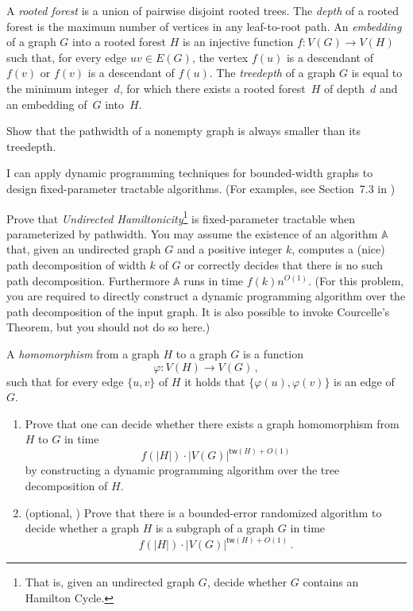 \documentclass[english]{uebung_cs}
\begin{document}
\begin{exercise}[Treedepth][\hard]
  A \emph{rooted forest} is a union of pairwise disjoint rooted trees. The \emph{depth} of a rooted forest is the maximum number of vertices in any leaf-to-root path. An \emph{embedding} of a graph $G$ into a rooted forest $H$ is an injective function $f \colon V (G) \rightarrow V(H)$ such that, for every edge $uv \in E(G)$, the vertex $f(u)$ is a descendant of $f(v)$ or $f(v)$ is a descendant of $f(u)$. The \emph{treedepth} of a graph $G$ is equal to the minimum integer~$d$, for which there exists a rooted forest~$H$ of depth~$d$ and an embedding of~$G$ into~$H$.

  Show that the pathwidth of a nonempty graph is always smaller than its treedepth.
\end{exercise}

\newpage
\begin{skill}
  I can apply dynamic programming techniques for bounded-width graphs to design fixed-parameter tractable algorithms. \normalfont (For examples, see Section~7.3 in \cygan{})
\end{skill}

\begin{exercise}
  Prove that \emph{Undirected Hamiltonicity}\footnote{That is, given an undirected graph $G$, decide whether $G$ contains an Hamilton Cycle.} is fixed-parameter tractable when parameterized by pathwidth. You may assume the existence of an algorithm $\mathbb{A}$ that, given an undirected graph $G$ and a positive integer $k$, computes a (nice) path decomposition of width $k$ of $G$ or correctly decides that there is no such path decomposition. Furthermore $\mathbb{A}$ runs in time $f(k) n^{O(1)}$. (For this problem, you are required to directly construct a dynamic programming algorithm over the path decomposition of the input graph. It is also possible to invoke Courcelle's Theorem, but you should not do so here.)
\end{exercise}

\begin{exercise}
  A \emph{homomorphism} from a graph $H$ to a graph $G$ is a function \[\varphi:V(H)\rightarrow V(G) \,, \] such that for every edge $\{u,v\}$ of $H$ it holds that $\{\varphi(u),\varphi(v)\}$ is an edge of $G$.
  \begin{enumerate}
    \item Prove that one can decide whether there exists a graph homomorphism from $H$ to $G$ in time
          \[f(|H|)\cdot |V(G)|^{\mathsf{tw}(H)+O(1)} \]
          by constructing a dynamic programming algorithm over the tree decomposition of $H$.
    \item (optional, \hard) Prove that there is a bounded-error randomized algorithm to decide whether a graph $H$ is a subgraph of a graph $G$ in time
          \[f(|H|)\cdot |V(G)|^{\mathsf{tw}(H)+O(1)} \,.\]
  \end{enumerate}
\end{exercise}
\end{document}
